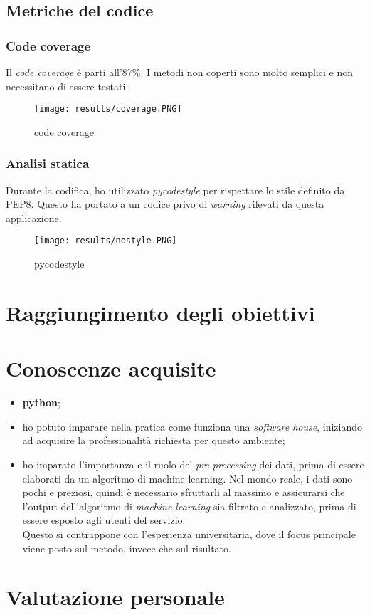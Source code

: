\subsection{Metriche del codice}
\subsubsection*{Code coverage}
Il \textit{code coverage} è parti all'87\%. I metodi non coperti sono molto semplici e non necessitano di essere testati. 
\begin{figure}[H]
    \centering
    \texttt{[image: results/coverage.PNG]} 
    \caption{code coverage}
    \label{coverage}
\end{figure}
\subsubsection*{Analisi statica}
Durante la codifica, ho utilizzato \textit{pycodestyle} per rispettare lo stile definito da PEP8. Questo ha portato a un codice privo di \textit{warning} rilevati da questa applicazione.
\begin{figure}[H]
    \centering
    \texttt{[image: results/nostyle.PNG]} 
    \caption{pycodestyle}
    \label{coverage}
\end{figure}
\section{Raggiungimento degli obiettivi}

\section{Conoscenze acquisite}
\begin{itemize}%
    \item \textbf{python};
    \item ho potuto imparare nella pratica come funziona una \textit{software house}, iniziando ad acquisire la professionalità richiesta per questo ambiente;
    \item ho imparato l'importanza e il ruolo del \textit{pre-processing} dei dati, prima di essere elaborati da un algoritmo di machine learning. Nel mondo reale, i dati sono pochi e preziosi, quindi è necessario sfruttarli al massimo e assicurarsi che l'output dell'algoritmo di \textit{machine learning} sia filtrato e analizzato, prima di essere esposto agli utenti del servizio.\\ Questo si contrappone con l'esperienza universitaria, dove il focus principale viene posto sul metodo, invece che sul risultato.
\end{itemize}
\section{Valutazione personale}
